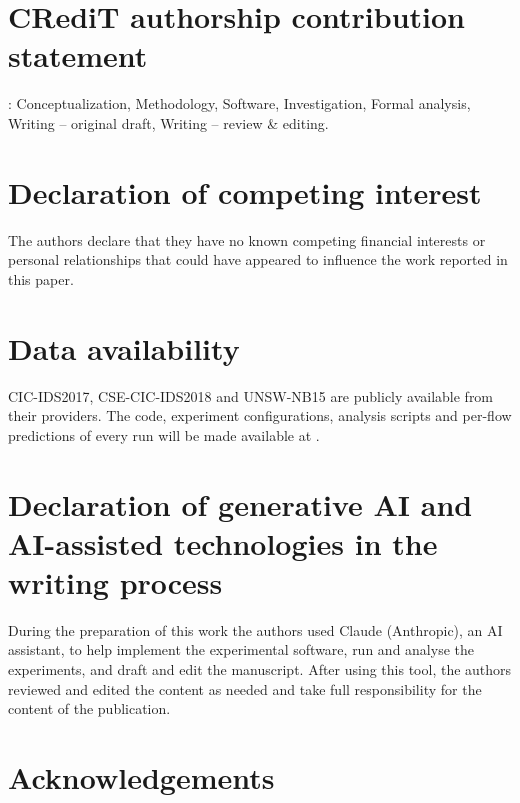 \section*{CRediT authorship contribution statement}
: Conceptualization, Methodology, Software, Investigation, Formal analysis, Writing -- original
draft, Writing -- review \& editing. 

\section*{Declaration of competing interest}
The authors declare that they have no known competing financial interests or personal relationships that could
have appeared to influence the work reported in this paper.

\section*{Data availability}
CIC-IDS2017, CSE-CIC-IDS2018 and UNSW-NB15 are publicly available from their providers. The code, experiment
configurations, analysis scripts and per-flow predictions of every run will be made available at .

\section*{Declaration of generative AI and AI-assisted technologies in the writing process}
During the preparation of this work the authors used Claude (Anthropic), an AI assistant, to help implement the
experimental software, run and analyse the experiments, and draft and edit the manuscript. After using this tool,
the authors reviewed and edited the content as needed and take full responsibility for the content of the
publication.

\section*{Acknowledgements}
